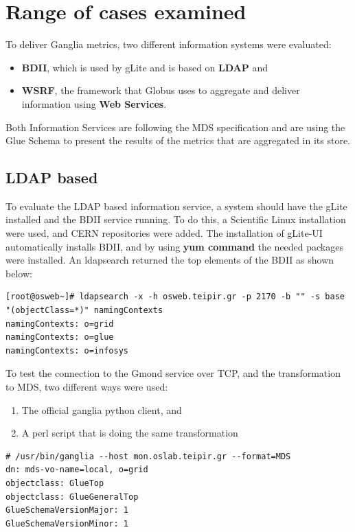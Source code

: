\section{Range of cases examined}

To deliver Ganglia metrics, two different information systems were evaluated:
\begin{itemize}
  \item {\bf BDII}, which is used by gLite and is based on {\bf LDAP} and
  \item {\bf WSRF}, the framework that Globus uses to aggregate and deliver information using {\bf Web Services}.
\end{itemize}

Both Information Services are following the MDS specification and are using the Glue Schema to present the results of the metrics that are aggregated in its store.

\subsection{LDAP based}

To evaluate the LDAP based information service, a system should have the gLite installed and the BDII service running. To do this, a Scientific Linux installation were used, and CERN repositories were added. The installation of gLite-UI automatically installs BDII, and by using {\bf yum command} the needed packages were installed. An ldapsearch returned the top elements of the BDII as shown below:

\begin{lstlisting}
[root@osweb~]# ldapsearch -x -h osweb.teipir.gr -p 2170 -b "" -s base "(objectClass=*)" namingContexts
namingContexts: o=grid
namingContexts: o=glue
namingContexts: o=infosys
\end{lstlisting}

To test the connection to the Gmond service over TCP, and the transformation to MDS, two different ways were used:

\begin{enumerate}
\item The official ganglia python client, and
\item A perl script that is doing the same transformation
\end{enumerate}

\begin{lstlisting}
# /usr/bin/ganglia --host mon.oslab.teipir.gr --format=MDS
dn: mds-vo-name=local, o=grid
objectclass: GlueTop
objectclass: GlueGeneralTop
GlueSchemaVersionMajor: 1
GlueSchemaVersionMinor: 1
\end{lstlisting}

